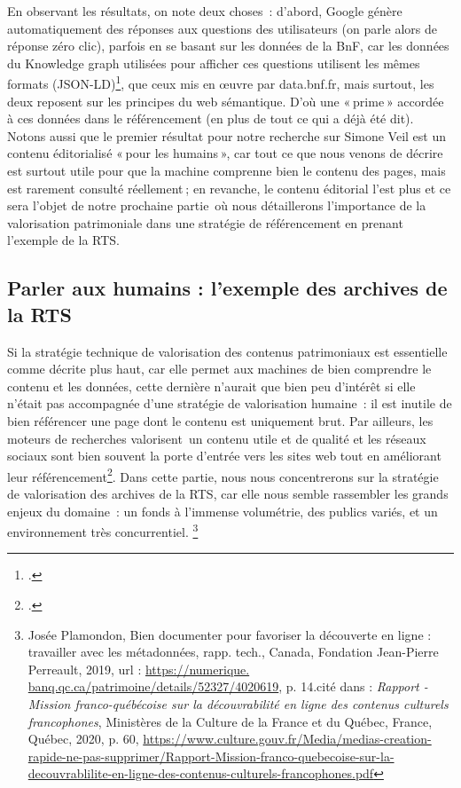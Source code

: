 En observant les résultats, on note deux choses : d’abord, Google génère automatiquement des réponses aux questions des utilisateurs (on parle alors de réponse zéro clic), parfois en se basant sur les données de la BnF, car les données du Knowledge graph utilisées pour afficher ces questions utilisent les mêmes formats (JSON-LD)\footcite{zotero-235}, que ceux mis en œuvre par data.bnf.fr, mais surtout, les deux reposent sur les principes du web sémantique. D’où une « prime » accordée à ces données dans le référencement (en plus de tout ce qui a déjà été dit). Notons aussi que le premier résultat pour notre recherche sur Simone Veil est un contenu éditorialisé « pour les humains », car tout ce que nous venons de décrire est surtout utile pour que la machine comprenne bien le contenu des pages, mais est rarement consulté réellement ; en revanche, le contenu éditorial l’est plus et ce sera l’objet de notre prochaine partie où nous détaillerons l’importance de la valorisation patrimoniale dans une stratégie de référencement en prenant l’exemple de la RTS.

\subsection{Parler aux humains : l'exemple des archives de la RTS}

Si la stratégie technique de valorisation des contenus patrimoniaux est essentielle comme décrite plus haut, car elle permet aux machines de bien comprendre le contenu et les données, cette dernière n’aurait que bien peu d’intérêt si elle n’était pas accompagnée d’une stratégie de valorisation humaine : il est inutile de bien référencer une page dont le contenu est uniquement brut. Par ailleurs, les moteurs de recherches valorisent un contenu utile et de qualité et les réseaux sociaux sont bien souvent la porte d’entrée vers les sites web tout en améliorant leur référencement\footcite{laura2022}. Dans cette partie, nous nous concentrerons sur la stratégie de valorisation des archives de la RTS, car elle nous semble rassembler les grands enjeux du domaine : un fonds à l’immense volumétrie, des publics variés, et un environnement très concurrentiel.
\footnote{Josée Plamondon, Bien documenter pour favoriser la découverte en ligne : travailler avec les métadonnées, rapp. tech., Canada, Fondation Jean-Pierre Perreault, 2019, url : \url{https://numerique.
		banq.qc.ca/patrimoine/details/52327/4020619}, p. 14.cité dans : \textit{Rapport - Mission franco-québécoise sur la découvrabilité en ligne des contenus culturels francophones}, Ministères de la Culture de la France et du Québec, France, Québec, 2020, p. 60, \url{https://www.culture.gouv.fr/Media/medias-creation-rapide-ne-pas-supprimer/Rapport-Mission-franco-quebecoise-sur-la-decouvrablilite-en-ligne-des-contenus-culturels-francophones.pdf}}



